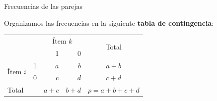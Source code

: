 \documentclass[spanish]{beamer}
\begin{document}





\begin{frame}{Frecuencias de las parejas}

Organizamos las frecuencias en la siguiente \textbf{tabla de contingencia}:\break

\begin{table}[h]
  \centering
  \label{tab:contingencia_var}
\resizebox{8cm}{!} {
\begin{tabular}{llrrrr}
\toprule
\multicolumn{2}{l}{\multirow{2}{*}{}} & \multicolumn{2}{c}{Ítem $k$} & \multicolumn{2}{c}{\multirow{2}{*}{Total}} \\\cmidrule{3-4}
\multicolumn{2}{l}{}                  & 1             & 0       & \multicolumn{2}{c}{}                        \\ \hline
\multirow{2}{*}{Ítem $i$}       & 1     & $a$          & $b$       & \multicolumn{2}{c}{$a+b$}                     \\
                              & 0      & c            & $d$       & \multicolumn{2}{c}{$c+d$}                     \\ \hline
\multicolumn{2}{l}{Total}            & $a+c$          & $b+d$     & \multicolumn{2}{c}{$p=a+b+c+d$}\\
\bottomrule            
\end{tabular}
}
\end{table}

\end{frame}
\end{document}
